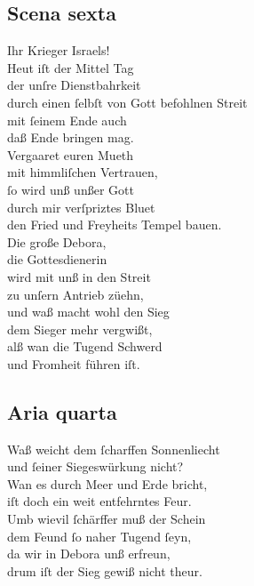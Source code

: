 \documentclass{ees}
\newenvironment{lyrics}[1]{%
  \subsection{#1}\nopagebreak%
  \begin{lyricslist}%
  \let\voice\item%
}{%
  \end{lyricslist}%
}
\begin{document}
\begin{lyrics}{Scena sexta}
  \voice[Barak]
  Ihr Krieger Israels!\\
  Heut iſt der Mittel Tag\\
  der unſre Dienstbahrkeit\\
  durch einen ſelbſt von Gott befohlnen Streit\\
  mit ſeinem Ende auch\\
  daß Ende bringen mag.\\
  Vergaaret euren Mueth\\
  mit himmliſchen Vertrauen,\\
  ſo wird unß unßer Gott\\
  durch mir verſpriztes Bluet\\
  den Fried und Freyheits Tempel bauen.\\
  Die große Debora,\\
  die Gottesdienerin\\
  wird mit unß in den Streit\\
  zu unſern Antrieb züehn,\\
  und waß macht wohl den Sieg\\
  dem Sieger mehr vergwißt,\\
  alß wan die Tugend Schwerd\\
  und Fromheit führen iſt.
\end{lyrics}

\begin{lyrics}{Aria quarta}
  \voice[Barak]
  Waß weicht dem ſcharffen Sonnenliecht\\
  und ſeiner Siegeswürkung nicht?\\
  Wan es durch Meer und Erde bricht,\\
  iſt doch ein weit entfehrntes Feur.\\[1ex]
  Umb wievil ſchärffer muß der Schein\\
  dem Feund ſo naher Tugend ſeyn,\\
  da wir in Debora unß erfreun,\\
  drum iſt der Sieg gewiß nicht theur.
\end{lyrics}
\end{document}

